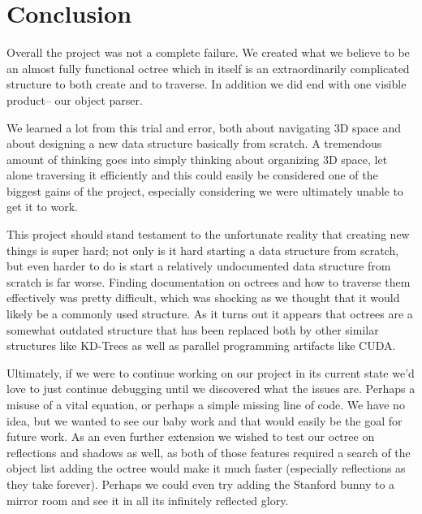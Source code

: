 \section{Conclusion}

\par Overall the project was not a complete failure. We created what we believe to be an almost fully functional octree which in itself is an extraordinarily complicated structure to both create and to traverse. In addition we did end with one visible product– our object parser. 
\par We learned a lot from this trial and error, both about navigating 3D space and about designing a new data structure basically from scratch. A tremendous amount of thinking goes into simply thinking about organizing 3D space, let alone traversing it efficiently and this could easily be considered one of the biggest gains of the project, especially considering we were ultimately unable to get it to work.
\par This project should stand testament to the unfortunate reality that creating new things is super hard; not only is it hard starting a data structure from scratch, but even harder to do is start a relatively undocumented data structure from scratch is far worse. Finding documentation on octrees and how to traverse them effectively was pretty difficult, which was shocking as we thought that it would likely be a commonly used structure. As it turns out it appears that octrees are a somewhat outdated structure that has been replaced both by other similar structures like KD-Trees as well as parallel programming artifacts like CUDA.
\par Ultimately, if we were to continue working on our project in its current state we'd love to just continue debugging until we discovered what the issues are. Perhaps a misuse of a vital equation, or perhaps a simple missing line of code. We have no idea, but we wanted to see our baby work and that would easily be the goal for future work. As an even further extension we wished to test our octree on reflections and shadows as well, as both of those features required a search of the object list adding the octree would make it much faster (especially reflections as they take forever). Perhaps we could even try adding the Stanford bunny to a mirror room and see it in all its infinitely reflected glory.




